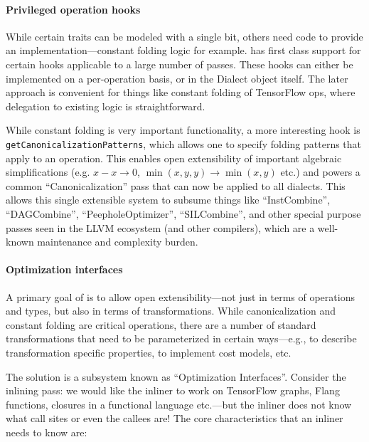 \paragraph{Privileged operation hooks}

While certain traits can be modeled with a single bit, others need \Cpp code to
provide an implementation---constant folding logic for example. \MLIR has first
class support for certain hooks applicable to a large number of passes. These
hooks can either be implemented on a per-operation basis, or in
the Dialect object itself. The later approach is
convenient for things like constant folding of TensorFlow ops, where delegation
to existing logic is straightforward.

While constant folding is very important functionality, a more interesting hook
is \lstinline|getCanonicalizationPatterns|, which allows one to specify folding
patterns that apply to an operation.  This enables open extensibility of important
algebraic simplifications (e.g. $x-x \rightarrow 0$, $\min(x,y,y) \rightarrow \min(x,y)$ etc.) and powers
a common ``Canonicalization'' pass that can now be applied to all dialects.  This
allows this single extensible system to subsume things like
``InstCombine'', ``DAGCombine'', ``PeepholeOptimizer'', ``SILCombine'', and
other special purpose passes seen in the LLVM ecosystem (and other
compilers), which are a well-known maintenance and complexity burden.

\paragraph{Optimization interfaces}\label{sec:interfaces}

A primary goal of \MLIR is to allow open extensibility---not just in terms of
operations and types, but also in terms of transformations.  While canonicalization
and constant folding are critical operations, there are a number of standard
transformations that need to be parameterized in certain ways---e.g., to describe
transformation specific properties, to implement cost models, etc.

The solution is a subsystem known as ``Optimization Interfaces''. Consider the
\MLIR inlining pass: we would like the inliner to work on TensorFlow graphs,
Flang functions, closures in a functional language etc.---but the inliner does
not know what call sites or even the callees are! The core characteristics that
an inliner needs to know are:

